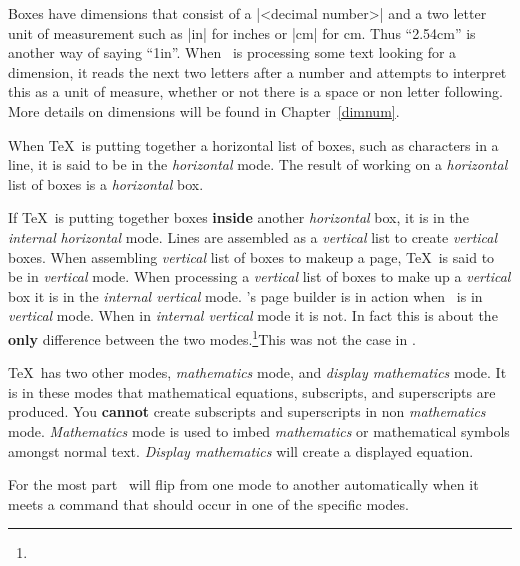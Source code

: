 \let\testhrule=\relax
\let\testvrule=\relax

Boxes have dimensions that consist of a |<decimal number>| and a two letter
unit of measurement such as |in| for inches or |cm| for cm. Thus ``2.54cm''
is another way of saying ``1in''. When \tex\ is processing some text looking
for a dimension, it reads the next two letters after a number and attempts to
interpret this as a unit of measure, whether or not there is a space or non
letter following. More details on dimensions will be found in
Chapter~\ref{dimnum}. 

When \TeX\  is
putting together a horizontal list of boxes, such as characters in a line,
it is said to be in the {\it horizontal}  mode. The result of working on a 
{\it horizontal} list of boxes is a {\it horizontal} box. 

If \TeX\  is putting together
boxes {\bf inside} another {\it horizontal} box, it is in the {\it internal}  {\it horizontal} mode.
Lines are assembled as a {\it vertical} list  to create {\it vertical} boxes. When 
assembling {\it vertical} list of boxes to makeup a page, \TeX\  is said to be in
{\it vertical} mode. When processing a {\it vertical} list of boxes to make up a
{\it vertical} box it is in the {\it internal vertical} mode. \tex's page builder is in
action when \tex\ is in {\it vertical} mode. When in {\it internal \it vertical} mode it is
not. In fact this is about the {\bf only} difference between the two 
modes.\footnote{\ddagger}{This was not the case in .} 

\TeX\ has two other modes, {\it mathematics} mode, and {\it display mathematics}
mode. It is in these modes that mathematical equations, subscripts, and 
superscripts are produced. You {\bf cannot} create subscripts and superscripts
in non {\it mathematics} mode. {\it Mathematics} mode is used to imbed {\it mathematics} 
or mathematical symbols amongst normal text. {\it Display mathematics} will 
create a displayed equation.

For the most part \tex\ will flip from one mode to another automatically when
it meets a command that should occur in one of the specific 
modes.

